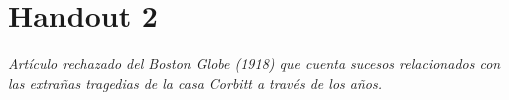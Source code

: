 \chapter{Handout 2}

\emph{Artículo rechazado del \emph{Boston Globe (1918)} que cuenta sucesos
relacionados con las extrañas tragedias de la casa Corbitt a través de los años.}

